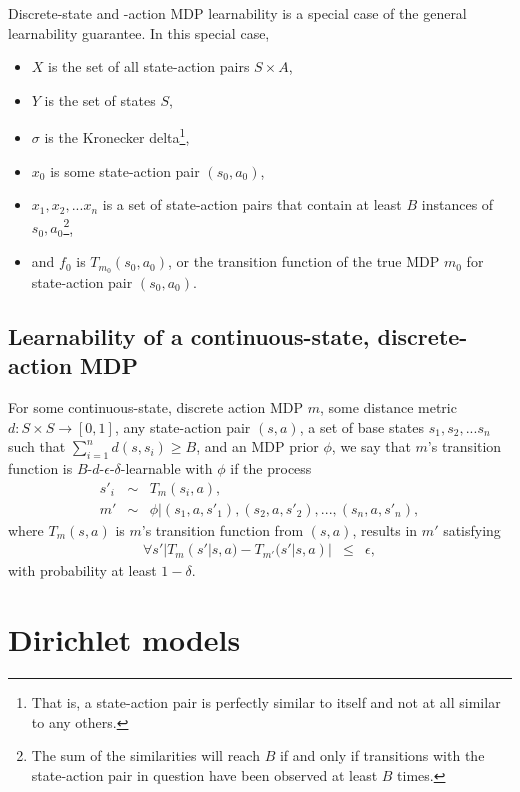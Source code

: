 Discrete-state and -action MDP learnability is a special case of the general learnability guarantee. In this special case,
\begin{itemize}
\item $X$ is the set of all state-action pairs $S\times A$,
\item $Y$ is the set of states $S$,
\item $\sigma$ is the Kronecker delta\footnote{That is, a state-action pair is perfectly similar to itself and not at all similar to any others.},
\item $x_0$ is some state-action pair $(s_0, a_0)$,
\item $x_1,x_2,...x_n$ is a set of state-action pairs that contain at least $B$ instances of $s_0,a_0$\footnote{The sum of the similarities will reach $B$ if and only if transitions with the state-action pair in question have been observed at least $B$ times.},
\item and $f_0$ is $T_{m_0}(s_0,a_0)$, or the transition function of the true MDP $m_0$ for state-action pair $(s_0,a_0)$.
\end{itemize}

\subsection{Learnability of a continuous-state, discrete-action MDP}

For some continuous-state, discrete action MDP $m$, some distance metric $d:S\times S\rightarrow[0,1]$, any state-action pair $(s,a)$, a set of base states $s_1, s_2, ... s_n$ such that $\sum_{i=1}^n d(s,s_i) \geq B$, and an MDP prior $\phi$, we say that $m$'s transition function is $B$-$d$-$\epsilon$-$\delta$-learnable with $\phi$ if the process
\begin{eqnarray}
s'_i &\sim& T_m(s_i,a),\\
m' &\sim& \phi | (s_1,a,s'_1), (s_2,a,s'_2), ..., (s_n,a,s'_n),
\end{eqnarray}
where $T_m(s,a)$ is $m$'s transition function from $(s,a)$, results in $m'$ satisfying
\begin{eqnarray}
\forall s' |T_m(s'|s,a) - T_{m'}(s'|s,a)| &\leq& \epsilon,
\end{eqnarray}
with probability at least $1-\delta$.

\section{Dirichlet models}

